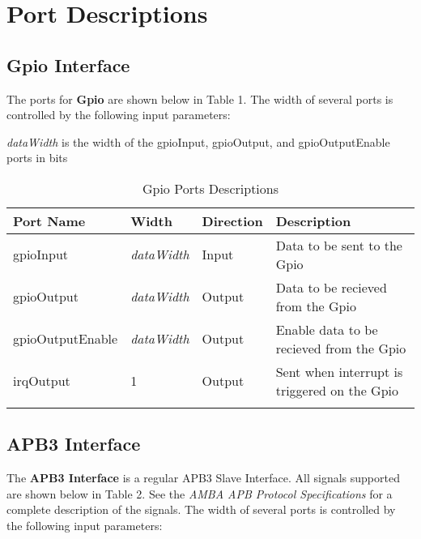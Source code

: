 \section{Port Descriptions}

\subsection{Gpio Interface}

The ports for \textbf{Gpio} are shown below in 
Table 1. The width of several ports is controlled 
by the following input parameters:

\textit{dataWidth} is the width of the gpioInput, gpioOutput, and gpioOutputEnable ports in bits
 
\renewcommand*{\arraystretch}{1.4}
\begin{longtable}[H]{
  | p{}
  | p{}
  | p{}
  | p{} |
  }
  \hline
  \textbf{Port Name} &   
  \textbf{Width} &   
  \textbf{Direction} &   
  \textbf{Description} \\ \hline \hline

  gpioInput &       
  \textit{dataWidth} & 
  Input &       
  Data to be sent to the Gpio\\ \hline

  gpioOutput &        
  \textit{dataWidth} & 
  Output &       
  Data to be recieved from the Gpio \\ \hline

  gpioOutputEnable &      
  \textit{dataWidth} & 
  Output &     
  Enable data to be recieved from the Gpio \\ \hline

  irqOutput &      
  1 & 
  Output &     
  Sent when interrupt is triggered on the Gpio \\ \hline
 
 
  \caption{Gpio Ports Descriptions}\label{table:ports}
\end{longtable}

\subsection{APB3 Interface}
The \textbf{APB3 Interface} is a regular APB3 Slave Interface. All signals supported are shown below in 
Table 2. See the \textit{AMBA APB Protocol Specifications} for a complete description of the signals. The width of several ports is controlled 
by the following input parameters:

